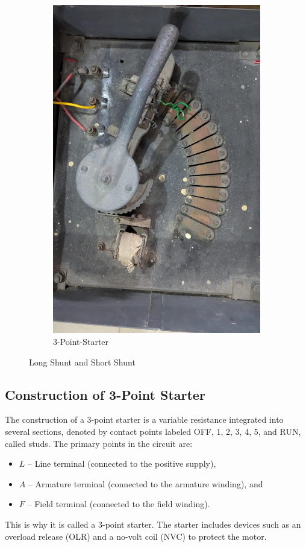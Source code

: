 \documentclass[a4paper,12pt]{article}
\begin{document}
\begin{figure}[H]
\begin{subfigure}[t]{0.48\textwidth}
			\includegraphics[width=0.7\linewidth]{Images/3ps}
			\caption{ 3-Point-Starter}
		\end{subfigure}
		
		\caption{Long Shunt and Short Shunt }
	\end{figure}
	
	\subsection{Construction of 3-Point Starter}
	
	The construction of a 3-point starter is a variable resistance integrated into several sections, denoted by contact points labeled OFF, 1, 2, 3, 4, 5, and RUN, called studs. The primary points in the circuit are:
	\begin{itemize}
		\item \(L\) – Line terminal (connected to the positive supply),
		\item \(A\) – Armature terminal (connected to the armature winding), and
		\item \(F\) – Field terminal (connected to the field winding).
	\end{itemize}
	
	This is why it is called a 3-point starter. The starter includes devices such as an overload release (OLR) and a no-volt coil (NVC) to protect the motor.
	
\end{document}
